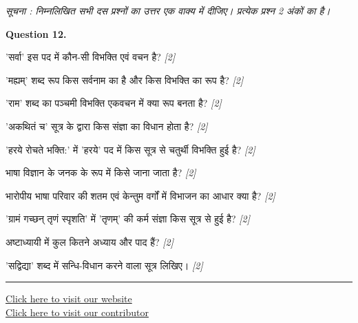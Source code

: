 \documentclass[11pt,a4paper]{article}
\newcommand{\pts}[1]{\hfill \textit{[#1]}}
\begin{document}
\noindent \textit{सूचना : निम्नलिखित सभी दस प्रश्नों का उत्तर एक वाक्य में दीजिए। प्रत्येक प्रश्न 2 अंकों का है।}\\[2pt]

\bigskip

\noindent \textbf{Question 12.}
\begin{parts}
  \item 'सर्वा' इस पद में कौन-सी विभक्ति एवं वचन है? \pts{2}
  \item 'मह्यम्' शब्द रूप किस सर्वनाम का है और किस विभक्ति का रूप है? \pts{2}
  \item 'राम' शब्द का पञ्चमी विभक्ति एकवचन में क्या रूप बनता है? \pts{2}
  \item 'अकथितं च' सूत्र के द्वारा किस संज्ञा का विधान होता है? \pts{2}
  \item 'हरये रोचते भक्ति:' में 'हरये' पद में किस सूत्र से चतुर्थी विभक्ति हुई है? \pts{2}
  \item भाषा विज्ञान के जनक के रूप में किसे जाना जाता है? \pts{2}
  \item भारोपीय भाषा परिवार की शतम एवं केन्तुम वर्गों में विभाजन का आधार क्या है? \pts{2}
  \item 'ग्रामं गच्छन् तृणं स्पृशति' में 'तृणम्' की कर्म संज्ञा किस सूत्र से हुई है? \pts{2}
  \item अष्टाध्यायी में कुल कितने अध्याय और पाद हैं? \pts{2}
  \item 'सद्विद्या' शब्द में सन्धि-विधान करने वाला सूत्र लिखिए। \pts{2}
\end{parts}

\vfill
\rule{\linewidth}{0.4pt}

\begin{center}\small
\href{https://bhu-exam.vercel.app/}{Click here to visit our website}\\[4pt]
\href{https://me-aryan.vercel.app/}{Click here to visit our contributor}
\end{center}
\end{document}
